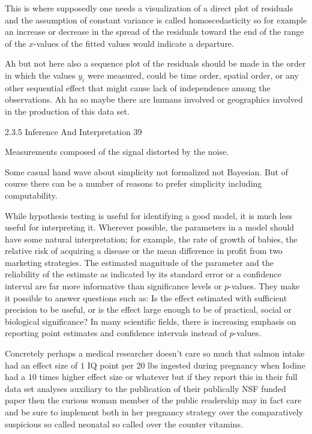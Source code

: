 This is where supposedly one needs a visualization of a direct plot of residuals and the assumption of constant variance is called homoscedasticity so for example an increase or decrease in the spread of the residuals toward the end of the range of the $x$-values of the fitted values would indicate a departure.

Ah but not here also a sequence plot of the residuals should be made in the order in which the values $y_i$ were measured, could be time order, spatial order, or any other sequential effect that might cause lack of independence among the observations. Ah ha so maybe there are humans involved or geographics involved in the production of this data set.

2.3.5 Inference And Interpretation 39

Measurements composed of the signal distorted by the noise.

Some casual hand wave about simplicity not formalized not Bayesian. But of course there can be a number of reasons to prefer simplicity including computability.

While hypothesis testing is useful for identifying a good model, it is much less useful for interpreting it. Wherever possible, the parameters in a model should have some natural interpretation; for example, the rate of growth of babies, the relative risk of acquiring a disease or the mean difference in profit from two marketing strategies. The estimated magnitude of the parameter and the reliability of the estimate as indicated by its standard error or a confidence interval are far more informative than significance levels or $p$-values. They make it possible to answer questions such as: Is the effect estimated with sufficient precision to be useful, or is the effect large enough to be of practical, social or biological significance? In many scientific fields, there is increasing emphasis on reporting point estimates and confidence intervals instead of $p$-values.

Concretely perhaps a medical researcher doesn't care so much that salmon intake had an effect size of $1$ IQ point per $20$ lbs ingested during pregnancy when Iodine had a $10$ times higher effect size or whatever but if they report this in their full data set analyses auxiliary to the publication of their publically NSF funded paper then the curious woman member of the public readership may in fact care and be sure to implement both in her pregnancy strategy over the comparatively suspicious so called neonatal so called over the counter vitamins.

